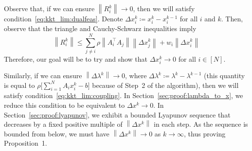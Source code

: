 \documentclass[11pt]{article}
\newcommand{\norm}[1]{\left\lVert #1 \right\rVert}
\begin{document}
Observe that, if we can ensure $\norm{R_i^k} \to 0$, then we will satisfy condition~\eqref{eq:kkt_lim:dualfeas}.
Denote $\Delta x_i^k \coloneqq x_i^k - x_i^{k - 1}$ for all $i$ and $k$. Then, observe that the triangle and Cauchy-Schwarz inequalities imply 
\begin{equation*}
\norm{R_i^k} \leq  \sum_{j \neq i}^N \rho \norm{A_i^\top A_j} \norm{\Delta x_j^k} + w_i\norm{\Delta x_i^k}
\end{equation*}
Therefore, our goal will be to try and show that $\Delta x_i^k \to 0$ for all $i \in [N]$.

Similarly, if we can ensure $\norm{\Delta \lambda^k} \to 0$, where $\Delta \lambda^k \coloneqq \lambda^k - \lambda^{k-1}$ (this quantity is equal to $\rho \big[\sum_{i = 1}^N A_i x_i^k - b\big]$ because of Step~2 of the algorithm), then we will satisfy condition~\eqref{eq:kkt_lim:coupling}.
In Section~\ref{sec:proof:lambda_to_x}, we reduce this condition to be equivalent to $\Delta x^k \to 0$.
In Section~\ref{sec:proof:lyapunov}, we exhibit a bounded Lyapunov sequence that decreases by a fixed positive multiple of $\norm{\Delta x^k}$ in each step.
As the sequence is bounded from below, we must have $\norm{\Delta x^k} \to 0$ as $k \to \infty$, thus proving Proposition~1.
\end{document}

